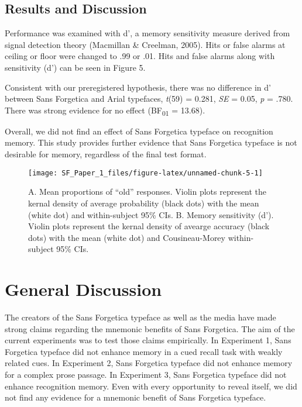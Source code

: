 \documentclass[
  english,
  jou]{apa6}
\begin{document}
\hypertarget{results-and-discussion-2}{%
\subsection{Results and Discussion}\label{results-and-discussion-2}}

Performance was examined with d', a memory sensitivity measure derived from signal detection theory (Macmillan \& Creelman, 2005). Hits or false alarms at ceiling or floor were changed to .99 or .01. Hits and false alarms along with sensitivity (d') can be seen in Figure 5.

Consistent with our preregistered hypothesis, there was no difference in d' between Sans Forgetica and Arial typefaces, \emph{t}(59) = 0.281, \emph{SE} = 0.05, \emph{p} = .780. There was strong evidence for no effect (BF\textsubscript{01} = 13.68).

Overall, we did not find an effect of Sans Forgetica typeface on recognition memory. This study provides further evidence that Sans Forgetica typeface is not desirable for memory, regardless of the final test format.

\begin{figure}

{\centering \texttt{[image: SF\_Paper\_1\_files/figure-latex/unnamed-chunk-5-1]} 

}

\caption{A. Mean proportions of “old” responses. Violin plots represent the kernal density of average probability (black dots) with the mean (white dot) and within-subject 95\% CIs. B. Memory sensitivity (d'). Violin plots represent the kernal density of avearge accuracy (black dots) with the mean (white dot) and Cousineau-Morey within-subject 95\% CIs.}\label{fig:unnamed-chunk-5}
\end{figure}

\hypertarget{general-discussion}{%
\section{General Discussion}\label{general-discussion}}

The creators of the Sans Forgetica typeface as well as the media have made strong claims regarding the mnemonic benefits of Sans Forgetica. The aim of the current experiments was to test those claims empirically. In Experiment 1, Sans Forgetica typeface did not enhance memory in a cued recall task with weakly related cues. In Experiment 2, Sans Forgetica typeface did not enhance memory for a complex prose passage. In Experiment 3, Sans Forgetica typeface did not enhance recognition memory. Even with every opportunity to reveal itself, we did not find any evidence for a mnemonic benefit of Sans Forgetica typeface.
\end{document}
